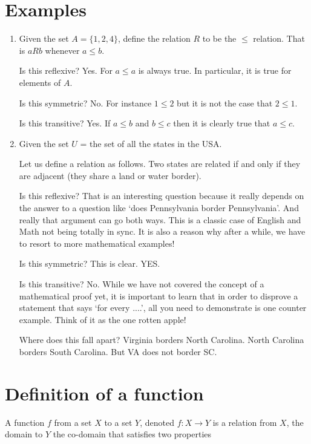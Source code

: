 \documentclass[12pt]{article}
\begin{document}
\section*{Examples}
\begin{enumerate}
\item Given the set $A = \{1, 2, 4\}$, define the relation $R$ to be the $\le$ relation. That is $aRb$ whenever $a \le b$.

Is this reflexive?  Yes. For $a \le a$ is always true. In particular, it is true for elements of $A$.

Is this symmetric? No. For instance $1 \le 2$ but it is not the case that $2 \le 1$.

Is this transitive? Yes. If $a \le b$ and $ b \le c$ then it is clearly true that $a \le c$.

\item Given the set $U$ = the set of all the states in the USA. 

Let us define a relation as follows. Two states are related if and only if they are adjacent (they share a land or water border). 

Is this reflexive? That is an interesting question because it really depends on the answer to a question like `does Pennsylvania border Pennsylvania'. And really that argument can go both ways. This is a classic case of English and Math not being totally in sync. It is also a reason why after a while, we have to resort to more mathematical examples!

Is this symmetric? This is clear. YES. 

Is this transitive? No. While we have not covered the concept of a mathematical proof yet, it is important to learn that in order to disprove a statement that says `for every ....', all you need to demonstrate is one counter example. Think of it as the one rotten apple!

Where does this fall apart? Virginia borders North Carolina. North Carolina borders South Carolina. But VA does not border SC. 

\end{enumerate}


\section*{Definition of a function}

A function $f$ from a set $X$ to a set $Y$, denoted $f : X \rightarrow Y$ is a relation from $X$, the domain
to $Y$ the co-domain that satisfies two properties
\end{document}
